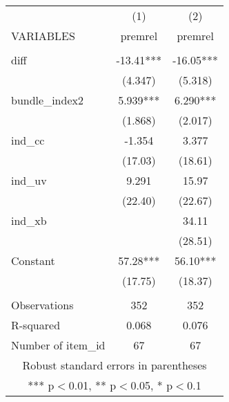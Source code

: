 \documentclass[]{article}
\begin{document}
\begin{tabular}{lcc} \hline
 & (1) & (2) \\
VARIABLES & premrel & premrel \\ \hline
 &  &  \\
diff & -13.41*** & -16.05*** \\
 & (4.347) & (5.318) \\
bundle\_index2 & 5.939*** & 6.290*** \\
 & (1.868) & (2.017) \\
ind\_cc & -1.354 & 3.377 \\
 & (17.03) & (18.61) \\
ind\_uv & 9.291 & 15.97 \\
 & (22.40) & (22.67) \\
ind\_xb &  & 34.11 \\
 &  & (28.51) \\
Constant & 57.28*** & 56.10*** \\
 & (17.75) & (18.37) \\
 &  &  \\
Observations & 352 & 352 \\
R-squared & 0.068 & 0.076 \\
 Number of item\_id & 67 & 67 \\ \hline
\multicolumn{3}{c}{ Robust standard errors in parentheses} \\
\multicolumn{3}{c}{ *** p$<$0.01, ** p$<$0.05, * p$<$0.1} \\
\end{tabular}
\end{document}

